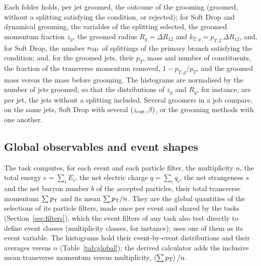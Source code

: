 Each folder holds, per jet groomed, the outcome of the grooming (groomed, without a splitting satisfying the condition,
or rejected); for Soft Drop and dynamical grooming, the variables of the splitting selected, the groomed momentum
fraction $z_g$, the groomed radius $R_g = \Delta R_{12}$ and $k_{T,g} = p_{T,2}\,\Delta R_{12}$, and, for Soft Drop, the
number $n_{\rm SD}$ of splittings of the primary branch satisfying the condition; and, for the groomed jets, their
$p_T$, mass and number of constituents, the fraction of the transverse momentum removed, $1 - p_{T,g}/p_T$, and the
groomed mass versus the mass before grooming. The histograms are normalised by the number of jets groomed, so that
the distributions of $z_g$ and $R_g$, for instance, are per jet, the jets without a splitting included. Several groomers
in a job compare, on the same jets, Soft Drop with several $(z_{\rm cut},\beta)$, or the grooming methods with one
another.

\subsection{Global observables and event shapes}
\label{sec:global}

The task  computes, for each event and each particle filter, the multiplicity $n$, the total energy
$e=\sum_i E_i$, the net electric charge $q=\sum_i q_i$, the net strangeness $s$ and the net baryon number $b$ of the
accepted particles, their total transverse momentum $\sum p_{\mathrm{T}}$ and its mean $\sum p_{\mathrm{T}}/n$. They are the global quantities
of the selections of its particle filters, made once per event and shared by the tasks (Section~\ref{sec:filters}), which
the event filters of any task also test directly to define event classes (multiplicity classes, for instance);
 uses one of them as its event variable. The histograms hold their event-by-event
distributions and their averages versus $n$ (Table~\ref{tab:global}); the derived calculator adds the inclusive mean
transverse momentum versus multiplicity, $\left\langle \sum p_{\mathrm{T}} \right\rangle/n$.

